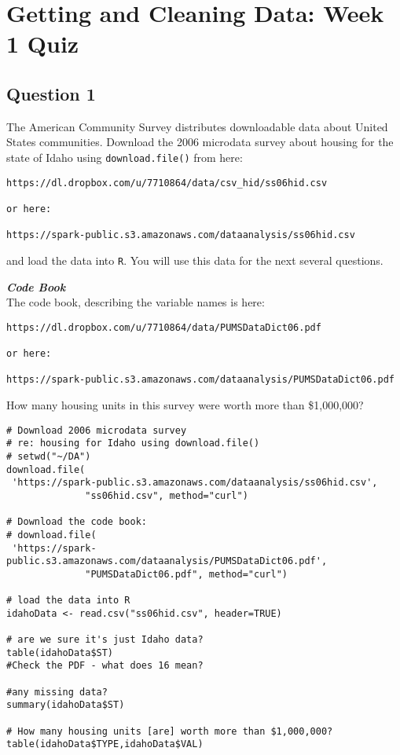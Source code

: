 \documentclass[]{article}
\begin{document}
\section{Getting and Cleaning Data: Week 1 Quiz}

\newpage
\subsection*{Question 1}

The American Community Survey distributes downloadable data about United States communities. 
Download the 2006 microdata survey about housing for the state of Idaho using \texttt{download.file()} from here: 

\begin{verbatim}
https://dl.dropbox.com/u/7710864/data/csv_hid/ss06hid.csv

or here:

https://spark-public.s3.amazonaws.com/dataanalysis/ss06hid.csv 
\end{verbatim}
and load the data into \texttt{R}. You will use this data for the next several questions. 

\noindent \textbf{\textit{Code Book}}\\
The code book, describing the variable names is here: 

\begin{verbatim}
https://dl.dropbox.com/u/7710864/data/PUMSDataDict06.pdf

or here: 

https://spark-public.s3.amazonaws.com/dataanalysis/PUMSDataDict06.pdf
\end{verbatim}
\bigskip
How many housing units in this survey were worth more than \$1,000,000?

\begin{framed}
\begin{verbatim}
# Download 2006 microdata survey 
# re: housing for Idaho using download.file()
# setwd("~/DA")
download.file(
 'https://spark-public.s3.amazonaws.com/dataanalysis/ss06hid.csv',
              "ss06hid.csv", method="curl")

# Download the code book:
# download.file(
 'https://spark-public.s3.amazonaws.com/dataanalysis/PUMSDataDict06.pdf',
              "PUMSDataDict06.pdf", method="curl")

# load the data into R
idahoData <- read.csv("ss06hid.csv", header=TRUE)

# are we sure it's just Idaho data?
table(idahoData$ST)
#Check the PDF - what does 16 mean?

#any missing data?
summary(idahoData$ST)

# How many housing units [are] worth more than $1,000,000?
table(idahoData$TYPE,idahoData$VAL)
\end{verbatim}
\end{framed}
\end{document}
